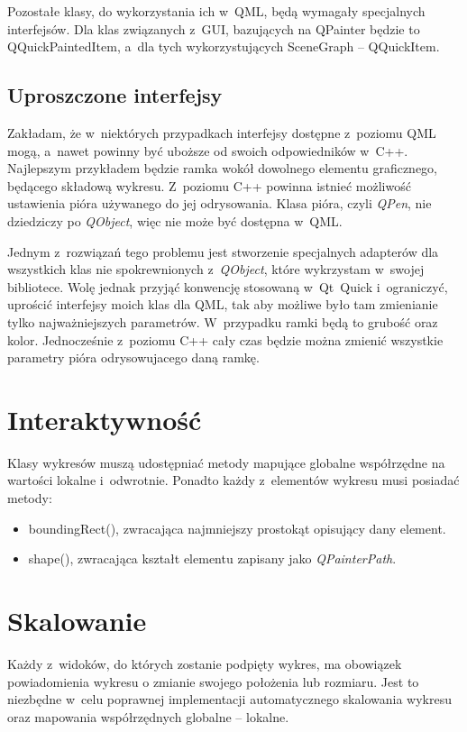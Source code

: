 Pozostałe klasy, do wykorzystania ich w~QML, będą wymagały specjalnych interfejsów. Dla klas związanych z~GUI, bazujących na QPainter będzie to QQuickPaintedItem, a~dla tych wykorzystujących SceneGraph -- QQuickItem.

\subsection{Uproszczone interfejsy}
Zakładam, że w~niektórych przypadkach interfejsy dostępne z~poziomu QML mogą, a~nawet powinny być uboższe od swoich odpowiedników w~C++. Najlepszym przykładem będzie ramka wokół dowolnego elementu graficznego, będącego składową wykresu. Z~poziomu C++ powinna istnieć możliwość ustawienia pióra używanego do jej odrysowania. Klasa pióra, czyli \textit{QPen}, nie dziedziczy po \textit{QObject}, więc nie może być dostępna w~QML.

Jednym z~rozwiązań tego problemu jest stworzenie specjalnych adapterów dla wszystkich klas nie spokrewnionych z~\textit{QObject}, które wykrzystam w~swojej bibliotece. Wolę jednak przyjąć konwencję stosowaną w~Qt~Quick i~ograniczyć, uprościć interfejsy moich klas dla QML, tak aby możliwe było tam zmienianie tylko najważniejszych parametrów. W~przypadku ramki będą to grubość oraz kolor. Jednocześnie z~poziomu C++ cały czas będzie można zmienić wszystkie parametry pióra odrysowujacego daną ramkę.

\section{Interaktywność}
Klasy wykresów muszą udostępniać metody mapujące globalne współrzędne na wartości lokalne i~odwrotnie. Ponadto każdy z~elementów wykresu musi posiadać metody:
\begin{itemize}
\item{boundingRect(), zwracająca najmniejszy prostokąt opisujący dany element.}
\item{shape(), zwracająca kształt elementu zapisany jako \textit{QPainterPath}.}
\end{itemize}

\section{Skalowanie}
Każdy z~widoków, do których zostanie podpięty wykres, ma obowiązek powiadomienia wykresu o zmianie swojego położenia lub rozmiaru. Jest to niezbędne w~celu poprawnej implementacji automatycznego skalowania wykresu oraz mapowania współrzędnych globalne -- lokalne.


